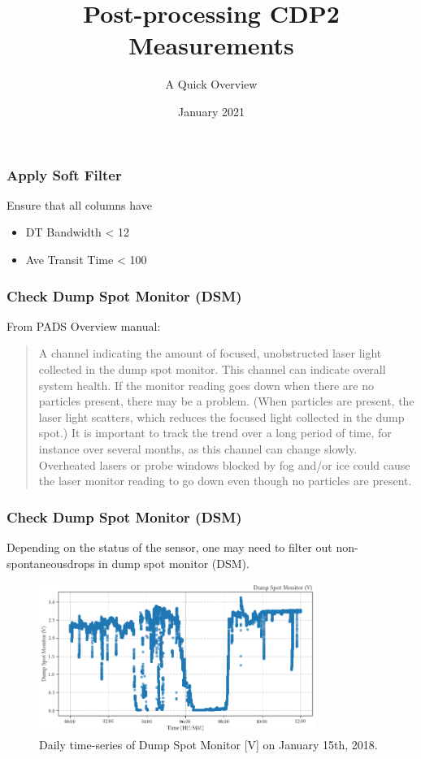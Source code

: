 \documentclass{beamer}
\title{Post-processing CDP2 Measurements}
\subtitle{A Quick Overview}
\date{January 2021}
\begin{document}
\frame{\titlepage}

\begin{frame}
    \frametitle{Apply Soft Filter}
    Ensure that all columns have

    \begin{itemize}
        \item DT Bandwidth < 12
        \item Ave Transit Time < 100\footnotemark
    \end{itemize}

\end{frame}

\begin{frame}
    \frametitle{Check Dump Spot Monitor (DSM)}
    From PADS Overview manual:

    \begin{quote}
        \small{A channel indicating the amount of focused, unobstructed laser light collected in the dump spot monitor. This channel can indicate overall system health. If the monitor reading goes down when there are no particles present, there may be a problem. (When particles are present, the laser light scatters, which reduces the focused light collected in the dump spot.) It is important to track the trend over a long period of time, for instance over several months, as this channel can change slowly. Overheated lasers or probe windows blocked by fog and/or ice could cause the laser monitor reading to go down even though no particles are present.}
    \end{quote}
\end{frame}

\begin{frame}
    \frametitle{Check Dump Spot Monitor (DSM)}
    Depending on the status of the sensor, one may need to filter out non-spontaneous\footnotemark drops in dump spot monitor (DSM).

    \begin{figure}
        \centering
        \includegraphics[width=0.8\textwidth]{img/dsm.png}
        \caption{Daily time-series of Dump Spot Monitor [V] on January 15th, 2018.}
    \end{figure}

\end{frame}
\end{document}
